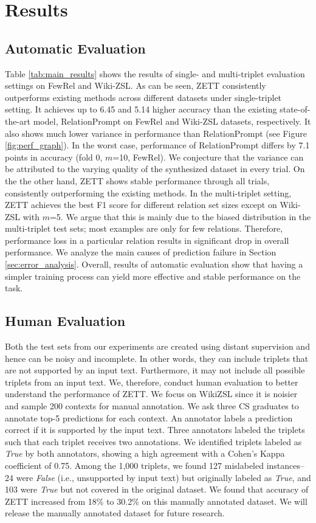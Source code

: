 \section{Results}
\subsection{Automatic Evaluation}
\label{sec:main_results}
Table \ref{tab:main_results} shows the results of single- and multi-triplet evaluation settings on FewRel and Wiki-ZSL. As can be seen, ZETT consistently outperforms existing methods across different datasets under single-triplet setting. It achieves up to 6.45 and 5.14 higher accuracy than the existing state-of-the-art model, RelationPrompt on FewRel and Wiki-ZSL datasets, respectively. It also shows much lower variance in performance than RelationPrompt (see Figure \ref{fig:perf_graph}). In  the worst case, performance of  RelationPrompt differs by 7.1 points in accuracy (fold 0, $m$=10, FewRel). We conjecture that the variance can be attributed to the varying quality of the synthesized dataset in every trial. On the the other hand, ZETT shows stable performance through all trials, consistently outperforming the existing methods. In the multi-triplet setting, ZETT achieves the best F1 score for different relation set sizes except on Wiki-ZSL with $m$=5. We argue that this is mainly due to the biased distribution in the multi-triplet test sets; most examples are only for few relations. Therefore, performance loss in a particular relation results in significant drop in overall performance. We analyze the main causes of prediction failure in Section \ref{sec:error_analysis}. Overall, results of automatic evaluation show that having a simpler training process can yield more effective and stable performance on the task. 

\subsection{Human Evaluation}
\label{sec:human_eval}
{Both the test sets from our experiments are created using distant supervision and hence can be noisy and incomplete. In other words, they can include triplets that are not supported by an input text. Furthermore, it may not include all possible triplets from an input text. We, therefore, conduct human evaluation to better understand the performance of ZETT. We focus on WikiZSL since it is noisier and sample 200 contexts for manual annotation. We ask three CS graduates to annotate top-5 predictions for each context. An annotator labels a prediction correct if it is supported by the input text.
Three annotators labeled the triplets such that each triplet receives two annotations. 
We identified triplets labeled as \textit{True} by both annotators, showing a high agreement with a Cohen's Kappa coefficient of 0.75. Among the 1,000 triplets, we found 127 mislabeled instances--24 were \textit{False} (i.e., unsupported by input text) but originally labeled as \textit{True}, and 103 were \textit{True} but not covered in the original dataset.
We found that accuracy of ZETT increased from 18\% to 30.2\% on this manually annotated dataset. We will release the manually annotated dataset for future research.}

